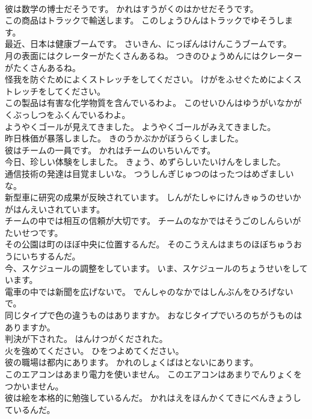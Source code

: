 \documentclass[8pt]{extreport}
\begin{document}
\begin{CJK}{UTF8}{min}
\\	彼は数学の博士だそうです。	かれはすうがくのはかせだそうです。 
\\	この商品はトラックで輸送します。	このしょうひんはトラックでゆそうします。 
\\	最近、日本は健康ブームです。	さいきん、にっぽんはけんこうブームです。 
\\	月の表面にはクレーターがたくさんあるね。	つきのひょうめんにはクレーターがたくさんあるね。 
\\	怪我を防ぐためによくストレッチをしてください。	けがをふせぐためによくストレッチをしてください。 
\\	この製品は有害な化学物質を含んでいるわよ。	このせいひんはゆうがいなかがくぶっしつをふくんでいるわよ。 
\\	ようやくゴールが見えてきました。	ようやくゴールがみえてきました。 
\\	昨日株価が暴落しました。	きのうかぶかがぼうらくしました。 
\\	彼はチームの一員です。	かれはチームのいちいんです。 
\\	今日、珍しい体験をしました。	きょう、めずらしいたいけんをしました。 
\\	通信技術の発達は目覚ましいな。	つうしんぎじゅつのはったつはめざましいな。 
\\	新型車に研究の成果が反映されています。	しんがたしゃにけんきゅうのせいかがはんえいされています。 
\\	チームの中では相互の信頼が大切です。	チームのなかではそうごのしんらいがたいせつです。 
\\	その公園は町のほぼ中央に位置するんだ。	そのこうえんはまちのほぼちゅうおうにいちするんだ。 
\\	今、スケジュールの調整をしています。	いま、スケジュールのちょうせいをしています。 
\\	電車の中では新聞を広げないで。	でんしゃのなかではしんぶんをひろげないで。 
\\	同じタイプで色の違うものはありますか。	おなじタイプでいろのちがうものはありますか。 
\\	判決が下された。	はんけつがくだされた。 
\\	火を強めてください。	ひをつよめてください。 
\\	彼の職場は都内にあります。	かれのしょくばはとないにあります。 
\\	このエアコンはあまり電力を使いません。	このエアコンはあまりでんりょくをつかいません。 
\\	彼は絵を本格的に勉強しているんだ。	かれはえをほんかくてきにべんきょうしているんだ。 

\end{CJK}
\end{document}
